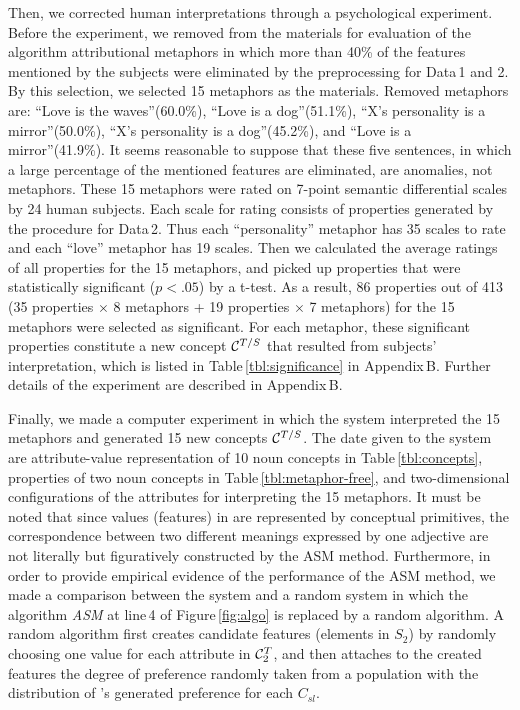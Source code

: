 Then, we corrected human interpretations through a psychological experiment.
Before the experiment, 
we removed from the materials for evaluation of the algorithm
attributional metaphors in which 
more than 40\% of the features mentioned by the subjects were eliminated
by the preprocessing for Data\,1 and 2.
By this selection, we selected 15 metaphors as the materials.
Removed metaphors are: 
``Love is the waves''(60.0\%), ``Love is
a dog''(51.1\%), ``X's personality is a mirror''(50.0\%), ``X's personality is
a dog''(45.2\%), and ``Love is a mirror''(41.9\%). 
It seems reasonable to suppose that these five sentences, in which a large
percentage of the mentioned features are eliminated, are anomalies, not metaphors.
These 15 metaphors were rated on 7-point semantic differential scales by 24 human subjects.
Each scale for rating consists of properties generated by the procedure for Data\,2.
Thus each ``personality'' metaphor has 35 scales to rate and 
each ``love'' metaphor has 19 scales.
Then we calculated the average ratings of all properties for the 15 metaphors, 
and picked up properties that were statistically significant ($p<.05$) by a t-test.
As a result, 86 properties out of 413
(35 properties $\times$ 8 metaphors + 19 properties $\times$ 7 metaphors)
for the 15 metaphors were selected as significant.
For each metaphor, these significant properties constitute a new concept ${\cal C}^{T/S}$ 
that resulted from subjects' interpretation, which is listed in 
Table\,\ref{tbl:significance} in Appendix\,B.
Further details of the experiment are described in Appendix\,B.

Finally, we made a computer experiment in which 
the \SNAME\/ system interpreted the 15 metaphors and generated 
15 new concepts ${\cal C}^{T/S}$.
The date given to the system are 
attribute-value representation of 10 noun concepts in Table\,\ref{tbl:concepts},
properties of two noun concepts in Table\,\ref{tbl:metaphor-free},
and two-dimensional configurations of the attributes for interpreting the 15 metaphors.
It must be noted that since values (features) in \SNAME\/ are
represented by conceptual primitives, the correspondence between two
different meanings expressed by one adjective 
are not literally but figuratively constructed by the ASM method.
Furthermore, in order to provide empirical evidence of the performance of the ASM method, 
we made a comparison between the \SNAME\/ system and a random system in which 
the algorithm {\it ASM\/} at line\,4 of Figure\,\ref{fig:algo}
is replaced by a random algorithm.
A random algorithm first creates candidate features (elements in $S_2$)
by randomly choosing one value for each attribute in ${\cal C}^T_2$, and then 
attaches to the created features the degree of preference randomly taken from 
a population with the distribution of \SNAME's generated preference for each $C_{sl}$.

